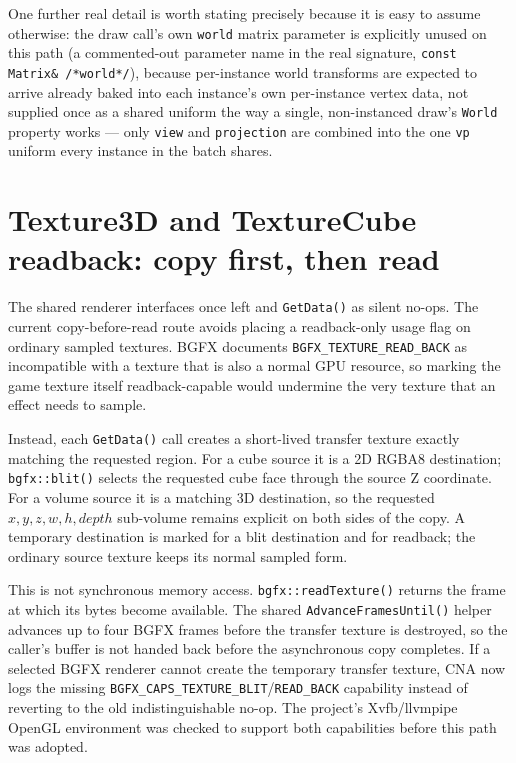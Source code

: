 One further real detail is worth stating precisely because it is easy to assume otherwise:
the draw call's own \texttt{world} matrix parameter is explicitly unused on this path (a
commented-out parameter name in the real signature, \texttt{const Matrix\&
/*world*/}), because per-instance world transforms are expected to arrive already baked into
each instance's own per-instance vertex data, not supplied once as a shared uniform the way a
single, non-instanced draw's \texttt{World} property works --- only \texttt{view} and
\texttt{projection} are combined into the one \texttt{vp} uniform every instance in the batch
shares.

\section{Texture3D and TextureCube readback: copy first, then read}

The shared renderer interfaces once left  and 
\texttt{GetData()} as silent no-ops. The current copy-before-read route avoids placing a
readback-only usage flag on ordinary sampled textures. BGFX documents
\texttt{BGFX\_TEXTURE\_READ\_BACK} as incompatible with a texture that is also a normal GPU
resource, so marking the game texture itself readback-capable would undermine the very texture
that an effect needs to sample.

Instead, each \texttt{GetData()} call creates a short-lived transfer texture exactly matching
the requested region. For a cube source it is a 2D RGBA8 destination; \texttt{bgfx::blit()}
selects the requested cube face through the source Z coordinate. For a volume source it is a
matching 3D destination, so the requested $x,y,z,w,h,depth$ sub-volume remains explicit on
both sides of the copy. A temporary destination is marked for a blit destination and for
readback; the ordinary source texture keeps its normal sampled form.

This is not synchronous memory access. \texttt{bgfx::readTexture()} returns the frame at which
its bytes become available. The shared \texttt{AdvanceFramesUntil()} helper advances up to four
BGFX frames before the transfer texture is destroyed, so the caller's buffer is not handed back
before the asynchronous copy completes.
If a selected BGFX renderer cannot create the temporary transfer texture, CNA now logs the
missing \texttt{BGFX\_CAPS\_TEXTURE\_BLIT}/\texttt{READ\_BACK} capability instead of reverting
to the old indistinguishable no-op. The project's Xvfb/llvmpipe OpenGL environment was checked
to support both capabilities before this path was adopted.


